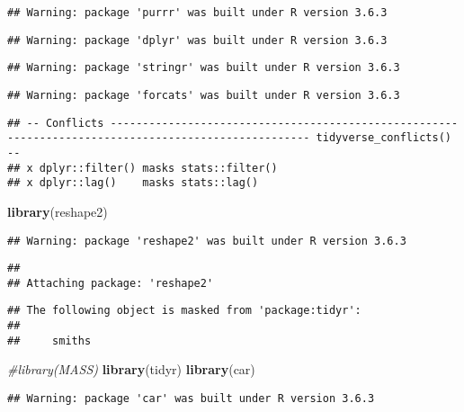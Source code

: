 \documentclass[
]{article}
\newenvironment{Shaded}{\begin{snugshade}}{\end{snugshade}}
\newcommand{\CommentTok}[1]{\textcolor[rgb]{0.56,0.35,0.01}{\textit{#1}}}
\newcommand{\KeywordTok}[1]{\textcolor[rgb]{0.13,0.29,0.53}{\textbf{#1}}}
\newcommand{\NormalTok}[1]{#1}
\begin{document}
\begin{verbatim}
## Warning: package 'purrr' was built under R version 3.6.3
\end{verbatim}

\begin{verbatim}
## Warning: package 'dplyr' was built under R version 3.6.3
\end{verbatim}

\begin{verbatim}
## Warning: package 'stringr' was built under R version 3.6.3
\end{verbatim}

\begin{verbatim}
## Warning: package 'forcats' was built under R version 3.6.3
\end{verbatim}

\begin{verbatim}
## -- Conflicts ----------------------------------------------------------------------------------------------------- tidyverse_conflicts() --
## x dplyr::filter() masks stats::filter()
## x dplyr::lag()    masks stats::lag()
\end{verbatim}

\begin{Shaded}
\begin{Highlighting}[]
\KeywordTok{library}\NormalTok{(reshape2)}
\end{Highlighting}
\end{Shaded}

\begin{verbatim}
## Warning: package 'reshape2' was built under R version 3.6.3
\end{verbatim}

\begin{verbatim}
## 
## Attaching package: 'reshape2'
\end{verbatim}

\begin{verbatim}
## The following object is masked from 'package:tidyr':
## 
##     smiths
\end{verbatim}

\begin{Shaded}
\begin{Highlighting}[]
\CommentTok{#library(MASS)}
\KeywordTok{library}\NormalTok{(tidyr)}
\KeywordTok{library}\NormalTok{(car)}
\end{Highlighting}
\end{Shaded}

\begin{verbatim}
## Warning: package 'car' was built under R version 3.6.3
\end{verbatim}
\end{document}

